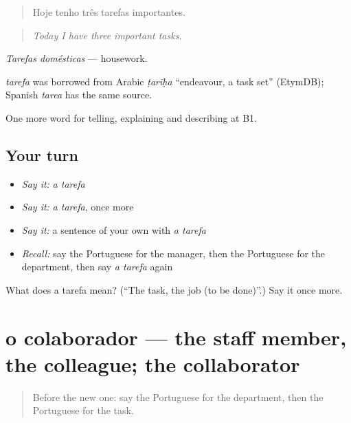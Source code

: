 \begin{quote}
Hoje tenho três tarefas importantes.
\end{quote}

\begin{quote}
\emph{Today I have three important tasks.}
\end{quote}

\emph{Tarefas domésticas} — housework.

\begin{cousinweb}
\emph{tarefa} was borrowed from Arabic \emph{ṭarīḥa} \textquotedblleft{}endeavour, a task set\textquotedblright{} (EtymDB); Spanish \emph{tarea} has the same source.
\end{cousinweb}

\begin{grammarlens}[title={What you've built}]
One more word for telling, explaining and describing at B1.
\end{grammarlens}

\subsection*{Your turn}
\begin{itemize}
\raggedright
  \item \emph{Say it:} \emph{a tarefa}
  \item \emph{Say it:} \emph{a tarefa}, once more
  \item \emph{Say it:} a sentence of your own with \emph{a tarefa}
  \item \emph{Recall:} say the Portuguese for the manager, then the Portuguese for the department, then say \emph{a tarefa} again
\end{itemize}

\begin{tcolorbox}[breakable,colback=teal!4,colframe=teal!35!black,title={Before you move on}]
What does a tarefa mean? (\textquotedblleft{}The task, the job (to be done)\textquotedblright{}.) Say it once more.
\end{tcolorbox}
\section[o colaborador]{o colaborador — the staff member, the colleague; the collaborator}

\label{lesson:PT-C359-colaborador}



\begin{quote}
Before the new one: say the Portuguese for the department, then the Portuguese for the task.
\end{quote}

